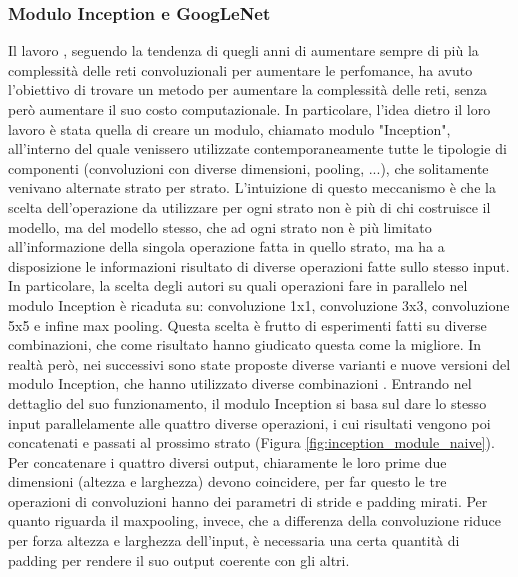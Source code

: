 \subsubsection{Modulo Inception e GoogLeNet}
Il lavoro \cite{inception}, seguendo la tendenza di quegli anni di aumentare sempre di più la complessità delle reti convoluzionali per aumentare le perfomance, ha avuto l'obiettivo di trovare un metodo per aumentare la complessità delle reti, senza però aumentare il suo costo computazionale. In particolare, l'idea dietro il loro lavoro è stata quella di creare un modulo, chiamato modulo "Inception", all'interno del quale venissero utilizzate contemporaneamente tutte le tipologie di componenti (convoluzioni con diverse dimensioni, pooling, ...), che solitamente venivano alternate strato per strato. L'intuizione di questo meccanismo è che la scelta dell'operazione da utilizzare per ogni strato non è più di chi costruisce il modello, ma del modello stesso, che ad ogni strato non è più limitato all'informazione della singola operazione fatta in quello strato, ma ha a disposizione le informazioni risultato di diverse operazioni fatte sullo stesso input. In particolare, la scelta degli autori su quali operazioni fare in parallelo nel modulo Inception è ricaduta su: convoluzione 1x1, convoluzione 3x3, convoluzione 5x5 e infine max pooling. Questa scelta è frutto di esperimenti fatti su diverse combinazioni, che come risultato hanno giudicato questa come la migliore. In realtà però, nei successivi sono state  proposte diverse varianti e nuove versioni del modulo Inception, che hanno utilizzato diverse combinazioni \cite{inceptionv2, inceptionv3, inceptionv4, xception}. Entrando nel dettaglio del suo funzionamento, il modulo Inception si basa sul dare lo stesso input parallelamente alle quattro diverse operazioni, i cui risultati vengono poi concatenati e passati al prossimo strato (Figura \ref{fig:inception_module_naive}). Per concatenare i quattro diversi output, chiaramente le loro prime due dimensioni (altezza e larghezza) devono coincidere, per far questo le tre operazioni di convoluzioni hanno dei parametri di stride e padding mirati. Per quanto riguarda il maxpooling, invece, che a differenza della convoluzione riduce per forza altezza e larghezza dell'input, è necessaria una certa quantità di padding per rendere il suo output coerente con gli altri.

